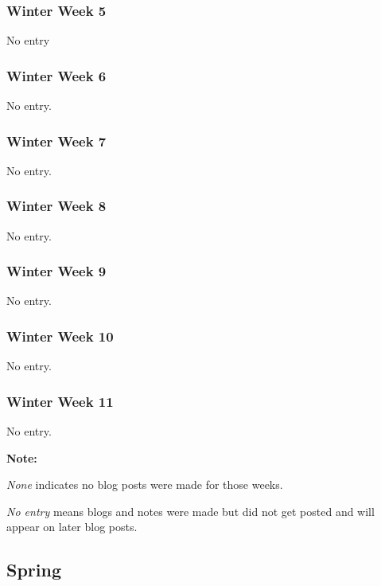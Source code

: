 \documentclass[compsoc,draftclsnofoot,onecolumn,10pt]{IEEEtran}
\begin{document}
\subsubsection*{Winter Week 5}
No entry


\subsubsection*{Winter Week 6}
No entry.


\subsubsection*{Winter Week 7}
No entry.


\subsubsection*{Winter Week 8}
No entry.


\subsubsection*{Winter Week 9}
No entry.


\subsubsection*{Winter Week 10}
No entry.


\subsubsection*{Winter Week 11}
No entry.



\textbf{Note:}\par
\textit{None} indicates no blog posts were made for those weeks.\par
\textit{No entry} means blogs and notes were made but did not get posted and will
appear on later blog posts.

\subsection{Spring}
\end{document}
